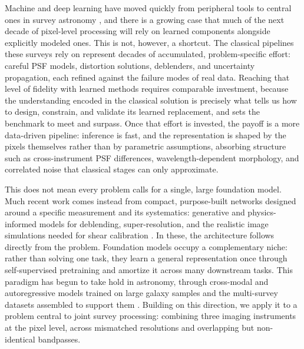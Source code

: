 \documentclass[twocolumn,linenumbers]{aastex701}
\begin{document}
Machine and deep learning have moved quickly from peripheral tools to central ones in survey astronomy \citep[e.g.,][]{baron2019, Huertas2023, Smith_2023}, and there is a growing case that much of the next decade of pixel-level processing will rely on learned components alongside explicitly modeled ones. This is not, however, a shortcut. The classical pipelines these surveys rely on represent decades of accumulated, problem-specific effort: careful PSF models, distortion solutions, deblenders, and uncertainty propagation, each refined against the failure modes of real data. Reaching that level of fidelity with learned methods requires comparable investment, because the understanding encoded in the classical solution is precisely what tells us how to design, constrain, and validate its learned replacement, and sets the benchmark to meet and surpass. Once that effort is invested, the payoff is a more data-driven pipeline: inference is fast, and the representation is shaped by the pixels themselves rather than by parametric assumptions, absorbing structure such as cross-instrument PSF differences, wavelength-dependent morphology, and correlated noise that classical stages can only approximate.

This does not mean every problem calls for a single, large foundation model. Much recent work comes instead from compact, purpose-built networks designed around a specific measurement and its systematics: generative and physics-informed models for deblending, super-resolution, and the realistic image simulations needed for shear calibration \citep[e.g.,][]{Hemmati2022, Haghjoo2026, Scognamiglio2025, Scognamiglio2026}. In these, the architecture follows directly from the problem. Foundation models occupy a complementary niche: rather than solving one task, they learn a general representation once through self-supervised pretraining and amortize it across many downstream tasks. This paradigm has begun to take hold in astronomy, through cross-modal and autoregressive models trained on large galaxy samples and the multi-survey datasets assembled to support them \citep[e.g.,][]{Parker_2024, Smith2024, MMU2024}. Building on this direction, we apply it to a problem central to joint survey processing: combining three imaging instruments at the pixel level, across mismatched resolutions and overlapping but non-identical bandpasses.
\end{document}
